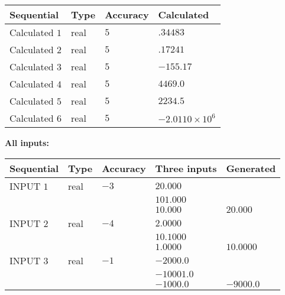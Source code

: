 \documentclass[12pt]{article}
\begin{document}
  
\noindent\begin{tabular}{|l|l|l|l|}
\hline
 Sequential & Type & Accuracy & Calculated \\ 
\hline
 
 
  Calculated $           1$ & real & $           5 $ & 
 $ .34483 $ 
 \\  \hline  
 
 
  Calculated $           2$ & real & $           5 $ & 
 $ .17241 $ 
 \\  \hline  
 
 
  Calculated $           3$ & real & $           5 $ & 
 $ -155.17 $ 
 \\  \hline  
 
 
  Calculated $           4$ & real & $           5 $ & 
 $ 4469.0 $ 
 \\  \hline  
 
 
  Calculated $           5$ & real & $           5 $ & 
 $ 2234.5 $ 
 \\  \hline  
 
 
  Calculated $           6$ & real & $           5 $ & 
 $ -2.0110 \times 10^{6} $ 
 \\  \hline  
 \end{tabular}
   
   
   
   
\noindent\vspace{0.1in}\hspace{-0.08in} {\textbf{\Large{All inputs: }}}
   
   
  
  
\noindent\begin{tabular}{|l|l|l|l|l|}
\hline
 Sequential & Type & Accuracy & Three inputs & Generated \\ 
\hline
 
 
  INPUT $           1$ & real & $          -3 $ & $
 20.000
  $ & \\
  & & &  $
 101.000
  $ & \\
  & & &  $
 10.000
 $ & $ 20.000 $ 
 \\  \hline  
 
 
  INPUT $           2$ & real & $          -4 $ & $
 2.0000
  $ & \\
  & & &  $
 10.1000
  $ & \\
  & & &  $
 1.0000
 $ & $ 10.0000 $ 
 \\  \hline  
 
 
  INPUT $           3$ & real & $          -1 $ & $
 -2000.0
  $ & \\
  & & &  $
 -10001.0
  $ & \\
  & & &  $
 -1000.0
 $ & $ -9000.0 $ 
 \\  \hline  
 \end{tabular}
   
\end{document}
